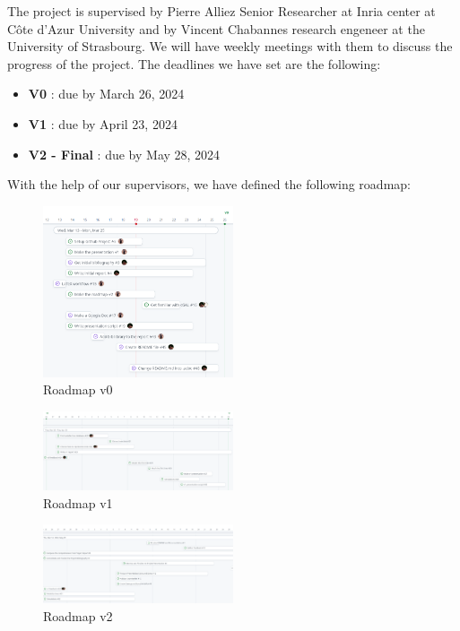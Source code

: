 \documentclass[12pt]{article}
\begin{document}
The project is supervised by Pierre Alliez
Senior Researcher at Inria center at Côte d'Azur University
and by Vincent Chabannes research engeneer at the University of Strasbourg.
We will have weekly meetings with them to discuss the progress of the project.
The deadlines we have set are the following:
\begin{itemize}
    \item \textbf{V0} : due by March 26, 2024
    \item \textbf{V1} : due by April 23, 2024
    \item \textbf{V2 - Final} : due by May 28, 2024
\end{itemize}

With the help of our supervisors, we have defined the following roadmap:

\begin{figure}[H]
    \centering
    \includegraphics[width=0.5\textwidth]{images/roadmap_v0.png}
    \caption{Roadmap v0}
\end{figure}

\begin{figure}[H]
    \centering
    \includegraphics[width=0.5\textwidth]{images/roadmap_v1.png}
    \caption{Roadmap v1}
\end{figure}

\begin{figure}[H]
    \centering
    \includegraphics[width=0.5\textwidth]{images/roadmap_v2.png}
    \caption{Roadmap v2}
\end{figure}
\end{document}
